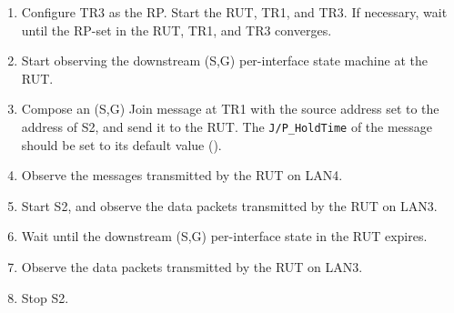 \documentclass[11pt]{report}
\begin{document}

\begin{enumerate}

  \item Configure TR3 as the RP. Start the RUT, TR1, and TR3. If
  necessary, wait until the RP-set in the RUT, TR1, and TR3
  converges.

  \item Start observing the downstream (S,G) per-interface state
  machine at the RUT.

  \item Compose an (S,G) Join message at TR1 with the source address set
  to the address of S2, and send it to the RUT.
  The \verb=J/P_HoldTime= of the message should be set to its default
  value ({\PimsmJPHoldTime}).

  \item Observe the messages transmitted by the RUT on LAN4.

  \item Start S2, and observe the data packets transmitted by the RUT on
  LAN3.

  \item Wait until the downstream (S,G) per-interface state in the RUT
  expires.

  \item Observe the data packets transmitted by the RUT on LAN3.

  \item Stop S2.

\end{enumerate}

\end{document}
